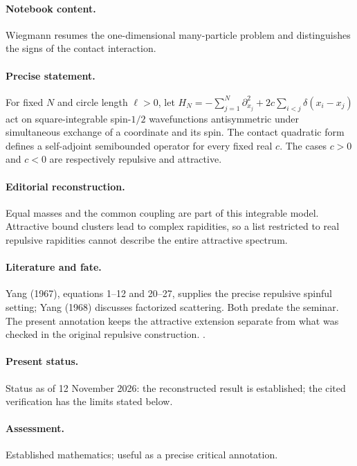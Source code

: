 \paragraph{Notebook content.} Wiegmann resumes the one-dimensional many-particle problem and distinguishes the signs of the contact interaction.

\paragraph{Precise statement.} For fixed $N$ and circle length $\ell>0$, let $H_N=-\sum_{j=1}^N\partial_{x_j}^2+2c\sum_{i<j}\delta(x_i-x_j)$ act on square-integrable spin-$1/2$ wavefunctions antisymmetric under simultaneous exchange of a coordinate and its spin. The contact quadratic form defines a self-adjoint semibounded operator for every fixed real $c$. The cases $c>0$ and $c<0$ are respectively repulsive and attractive.

\paragraph{Editorial reconstruction.} Equal masses and the common coupling are part of this integrable model. Attractive bound clusters lead to complex rapidities, so a list restricted to real repulsive rapidities cannot describe the entire attractive spectrum.

\paragraph{Literature and fate.} Yang (1967), equations 1--12 and 20--27, supplies the precise repulsive spinful setting; Yang (1968) discusses factorized scattering. Both predate the seminar. The present annotation keeps the attractive extension separate from what was checked in the original repulsive construction. \citep{yang1967manybody,yang1968smatrix}.

\paragraph{Present status.} Status as of 12 November 2026: the reconstructed result is established; the cited verification has the limits stated below.

\paragraph{Assessment.} Established mathematics; useful as a precise critical annotation.

